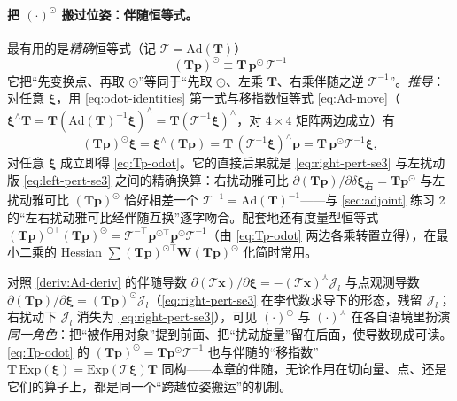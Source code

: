 \paragraph{把 $(\cdot)^\odot$ 搬过位姿：伴随恒等式。}最有用的是\emph{精确}恒等式（记 $\boldsymbol{\mathcal{T}}=\mathrm{Ad}(\mathbf{T})$）
\begin{equation}
  \boxed{\;(\mathbf{T}\mathbf{p})^{\odot}\equiv\mathbf{T}\,\mathbf{p}^{\odot}\,\boldsymbol{\mathcal{T}}^{-1}\;}
  \label{eq:Tp-odot}
\end{equation}
它把“先变换点、再取 $\odot$”等同于“先取 $\odot$、左乘 $\mathbf{T}$、右乘伴随之逆 $\boldsymbol{\mathcal{T}}^{-1}$”。\emph{推导}：对任意 $\boldsymbol{\xi}$，用 \cref{eq:odot-identities} 第一式与移指数恒等式 \cref{eq:Ad-move}（$\boldsymbol{\xi}^\wedge\mathbf{T}=\mathbf{T}(\mathrm{Ad}(\mathbf{T})^{-1}\boldsymbol{\xi})^\wedge=\mathbf{T}(\boldsymbol{\mathcal{T}}^{-1}\boldsymbol{\xi})^\wedge$，对 $4\times4$ 矩阵两边成立）有
\[
  (\mathbf{T}\mathbf{p})^{\odot}\boldsymbol{\xi}=\boldsymbol{\xi}^\wedge(\mathbf{T}\mathbf{p})=\mathbf{T}\,(\boldsymbol{\mathcal{T}}^{-1}\boldsymbol{\xi})^\wedge\mathbf{p}=\mathbf{T}\,\mathbf{p}^{\odot}\boldsymbol{\mathcal{T}}^{-1}\boldsymbol{\xi},
\]
对任意 $\boldsymbol{\xi}$ 成立即得 \cref{eq:Tp-odot}。它的直接后果就是 \cref{eq:right-pert-se3} 与左扰动版 \cref{eq:left-pert-se3} 之间的精确换算：右扰动雅可比 $\partial(\mathbf{T}\mathbf{p})/\partial\delta\boldsymbol{\xi}_{\text{右}}=\mathbf{T}\mathbf{p}^{\odot}$ 与左扰动雅可比 $(\mathbf{T}\mathbf{p})^{\odot}$ 恰好相差一个 $\boldsymbol{\mathcal{T}}^{-1}=\mathrm{Ad}(\mathbf{T})^{-1}$——与 \cref{sec:adjoint} 练习 2 的“左右扰动雅可比经伴随互换”逐字吻合。配套地还有度量型恒等式 $(\mathbf{T}\mathbf{p})^{\odot\top}(\mathbf{T}\mathbf{p})^{\odot}=\boldsymbol{\mathcal{T}}^{-\top}\mathbf{p}^{\odot\top}\mathbf{p}^{\odot}\boldsymbol{\mathcal{T}}^{-1}$（由 \cref{eq:Tp-odot} 两边各乘转置立得），在最小二乘的 Hessian $\sum(\mathbf{T}\mathbf{p})^{\odot\top}\mathbf{W}(\mathbf{T}\mathbf{p})^{\odot}$ 化简时常用。

\begin{insight}
对照 \cref{deriv:Ad-deriv} 的伴随导数 $\partial(\boldsymbol{\mathcal{T}}\mathbf{x})/\partial\boldsymbol{\xi}=-(\boldsymbol{\mathcal{T}}\mathbf{x})^\curlywedge\boldsymbol{\mathcal{J}}_l$ 与点观测导数 $\partial(\mathbf{T}\mathbf{p})/\partial\boldsymbol{\xi}=(\mathbf{T}\mathbf{p})^\odot\boldsymbol{\mathcal{J}}_l$（\cref{eq:right-pert-se3} 在李代数求导下的形态，残留 $\boldsymbol{\mathcal{J}}_l$；右扰动下 $\boldsymbol{\mathcal{J}}_l$ 消失为 \cref{eq:right-pert-se3}），可见 $(\cdot)^\odot$ 与 $(\cdot)^\curlywedge$ 在各自语境里扮演\emph{同一角色}：把“被作用对象”提到前面、把“扰动旋量”留在后面，使导数现成可读。\cref{eq:Tp-odot} 的 $(\mathbf{T}\mathbf{p})^\odot=\mathbf{T}\mathbf{p}^\odot\boldsymbol{\mathcal{T}}^{-1}$ 也与伴随的“移指数”$\mathbf{T}\,\mathrm{Exp}(\boldsymbol{\xi})=\mathrm{Exp}(\boldsymbol{\mathcal{T}}\boldsymbol{\xi})\mathbf{T}$ 同构——本章的伴随，无论作用在切向量、点、还是它们的算子上，都是同一个“跨越位姿搬运”的机制。
\end{insight}


